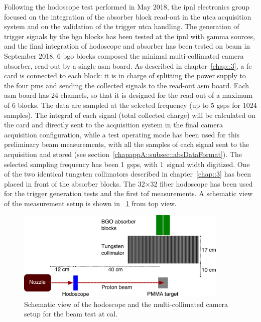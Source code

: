 Following the hodoscope test performed in May 2018, the \gls{ipnl} electronics group focused on the integration of the absorber block read-out in the \gls{utca} acquisition system and on the validation of the trigger \gls{utca} handling. The generation of trigger signals by the \gls{bgo} blocks has been tested at the \gls{ipnl} with gamma sources, and the final integration of hodoscope and absorber has been tested on beam in September 2018. 
6 \gls{bgo} blocks composed the minimal multi-collimated camera absorber, read-out by a single \gls{asm} board. As described in chapter~\ref{chap::3}, a \gls{fe} card is connected to each block: it is in charge of splitting the power supply to the four \glspl{pm} and sending the collected signals to the read-out \gls{asm} board. Each \gls{asm} board has 24 channels, so that it is designed for the read-out of a maximum of 6 blocks. The data are sampled at the selected frequency (up to 5 \gls{gsps} for 1024 samples). The integral of each signal (total collected charge) will be calculated on the card and directly sent to the acquisition system in the final camera acquisition configuration, while a test operating mode has been used for this preliminary beam measurements, with all the samples of each signal sent to the acquisition and stored (see section~\ref{chapappA::subsec::absDataFormat}). The selected sampling frequency has been 1 \gls{gsps}, with 1~\charmus signal width digitized. 
One of the two identical tungsten collimators described in chapter~\ref{chap::3} has been placed in front of the absorber blocks. The 32$\times$32 fiber hodoscope has been used for the trigger generation tests and the first \gls{tof} measurements.
A schematic view of the measurement setup is shown in \figurename~\ref{chap6::fig::September_DAQscheme} from top view. 

\begin{figure}[!htbp]
\centering
\includegraphics[width=0.9\textwidth]{03_GraphicFiles/chapter6_BeamTests/Nice_September2018/1Dscheme.png}
\caption{Schematic view of the hodoscope and the multi-collimated camera setup for the beam test at \gls{cal}.}
\label{chap6::fig::September_DAQscheme}
\end{figure}

